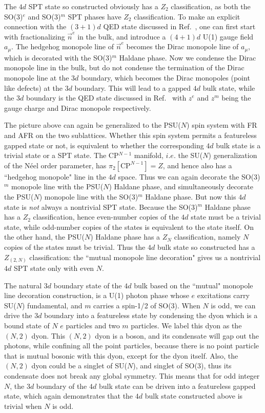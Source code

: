 \documentclass[aps,prb,twocolumn,superscriptaddress,showpacs]{revtex4}
\begin{document}
The $4d$ SPT state so constructed obviously has a $Z_2$
classification, as both the SO(3)$^e$ and SO(3)$^m$ SPT phases
have $Z_2$ classification. To make an explicit connection with the
$(3+1)d$ QED state discussed in Ref.~, one
can first start with fractionalizing $\vec{n}^e$ in the bulk, and
introduce a $(4+1)d$ U(1) gauge field $a_\mu$. The hedgehog
monopole line of $\vec{n}^{e}$ becomes the Dirac monopole line of
$a_\mu$, which is decorated with the SO(3)$^m$ Haldane phase. Now
we condense the Dirac monopole line in the bulk, but do not
condense the termination of the Dirac monopole line at the $3d$
boundary, which becomes the Dirac monopoles (point like defects)
at the $3d$ boundary. This will lead to a gapped $4d$ bulk state,
while the $3d$ boundary is the QED state discussed in
Ref.~ with $z^e$ and $z^m$ being the gauge
charge and Dirac monopole respectively.

The picture above can again be generalized to the PSU($N$) spin
system with FR and AFR on the two sublattices. Whether this spin
system permits a featureless gapped state or not, is equivalent to
whether the corresponding $4d$ bulk state is a trivial state or a
SPT state. The CP$^{N-1}$ manifold, $i.e.$ the SU($N$)
generalization of the N\'{e}el order parameter, has
$\pi_2[\mathrm{CP}^{N-1}] = Z$, and hence also has a ``hedgehog
monopole" line in the $4d$ space. Thus we can again decorate the
SO(3)$^m$ monopole line with the PSU($N$) Haldane phase, and
simultaneously decorate the PSU($N$) monopole line with the
SO(3)$^m$ Haldane phase. But now this $4d$ state is {\it not}
always a nontrivial SPT state. Because the SO(3)$^m$ Haldane phase
has a $Z_2$ classification, hence even-number copies of the $4d$
state must be a trivial state, while odd-number copies of the
states is equivalent to the state itself. On the other hand, the
PSU($N$) Haldane phase has a $Z_N$ classification, namely $N$
copies of the states must be trivial. Thus the $4d$ bulk state so
constructed has a $Z_{(2,N)}$ classification: the ``mutual
monopole line decoration" gives us a nontrivial $4d$ SPT state
only with even $N$.

The natural $3d$ boundary state of the $4d$ bulk based on the
``mutual" monopole line decoration construction, is a U(1) photon
phase whose $e$ excitations carry SU($N$) fundamental, and $m$
carries a spin-1/2 of SO(3). When $N$ is odd, we can drive the
$3d$ boundary into a featureless state by condensing the dyon
which is a bound state of $N$ $e$ particles and two $m$ particles.
We label this dyon as the $(N, 2)$ dyon. This $(N,2)$ dyon is a
boson, and its condensate will gap out the photons, while
confining all the point particles, because there is no point
particle that is mutual bosonic with this dyon, except for the
dyon itself. Also, the $(N, 2)$ dyon could be a singlet of
SU($N$), and singlet of SO(3), thus its condensate does not break
any global symmetry. This means that for odd integer $N$, the $3d$
boundary of the $4d$ bulk state can be driven into a featureless
gapped state, which again demonstrates that the $4d$ bulk state
constructed above is trivial when $N$ is odd.
\end{document}
